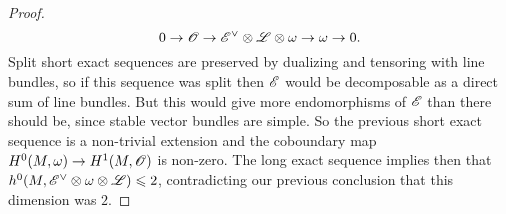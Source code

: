 \documentclass[A4paper, 12pt, british, reqno]{amsart}
\newcommand{\ot}{\otimes}
\newcommand{\dual}{^{\vee}}
\begin{document}
\begin{lm}
\begin{proof}
	\[ 0\to \O\to \E\dual\ot\L\ot\w\to \w\to 0. \]
	Split short exact sequences are preserved by dualizing and tensoring with line bundles, so if this sequence was split then $\mathscr{E}$ would be decomposable as a direct sum of line bundles.
	But this would give more endomorphisms of $\mathscr{E}$ than there should be, since stable vector bundles are simple.
	So the previous short exact sequence is a non-trivial extension and the coboundary map $H^{0}(M,\omega)\to H^{1}(M,\mathscr{O})$ is non-zero.
	The long exact sequence implies then that $h^{0}(M,\E\dual\ot \w\ot\L)\leqslant 2$, contradicting our previous conclusion that this dimension was $2$.
    \end{proof}
\end{lm}





\vfill
\end{document}
